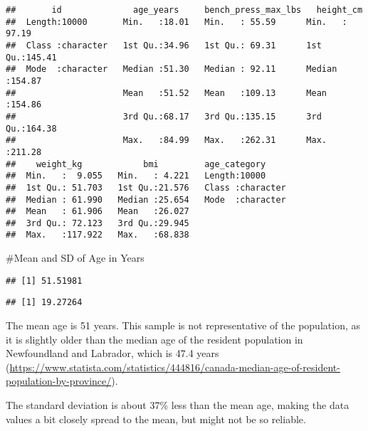 \documentclass[
]{article}
\newenvironment{Shaded}{\begin{snugshade}}{\end{snugshade}}
\newcommand{\KeywordTok}[1]{\textcolor[rgb]{0.13,0.29,0.53}{\textbf{#1}}}
\newcommand{\NormalTok}[1]{#1}
\newcommand{\OperatorTok}[1]{\textcolor[rgb]{0.81,0.36,0.00}{\textbf{#1}}}
\begin{document}
\begin{verbatim}
##       id              age_years     bench_press_max_lbs   height_cm     
##  Length:10000       Min.   :18.01   Min.   : 55.59      Min.   : 97.19  
##  Class :character   1st Qu.:34.96   1st Qu.: 69.31      1st Qu.:145.41  
##  Mode  :character   Median :51.30   Median : 92.11      Median :154.87  
##                     Mean   :51.52   Mean   :109.13      Mean   :154.86  
##                     3rd Qu.:68.17   3rd Qu.:135.15      3rd Qu.:164.38  
##                     Max.   :84.99   Max.   :262.31      Max.   :211.28  
##    weight_kg            bmi         age_category      
##  Min.   :  9.055   Min.   : 4.221   Length:10000      
##  1st Qu.: 51.703   1st Qu.:21.576   Class :character  
##  Median : 61.990   Median :25.654   Mode  :character  
##  Mean   : 61.906   Mean   :26.027                     
##  3rd Qu.: 72.123   3rd Qu.:29.945                     
##  Max.   :117.922   Max.   :68.838
\end{verbatim}

\#Mean and SD of Age in Years

\begin{Shaded}
\end{Shaded}

\begin{verbatim}
## [1] 51.51981
\end{verbatim}

\begin{Shaded}
\end{Shaded}

\begin{verbatim}
## [1] 19.27264
\end{verbatim}

The mean age is 51 years. This sample is not representative of the
population, as it is slightly older than the median age of the resident
population in Newfoundland and Labrador, which is 47.4 years
(\url{https://www.statista.com/statistics/444816/canada-median-age-of-resident-population-by-province/}).

The standard deviation is about 37\% less than the mean age, making the
data values a bit closely spread to the mean, but might not be so
reliable.
\end{document}
